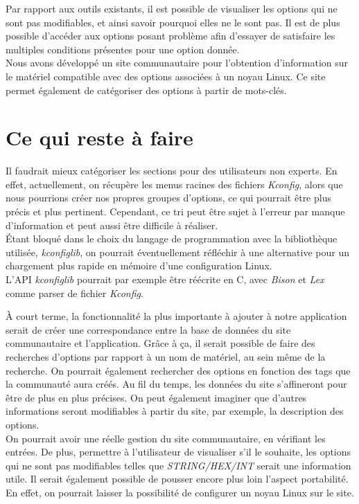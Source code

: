 ﻿\documentclass[17pts]{report}
\begin{document}
Par rapport aux outils existants, il est possible de visualiser les options qui
ne sont pas modifiables, et ainsi savoir pourquoi elles ne le sont pas.  Il est
de plus possible d'accéder aux options posant problème afin d'essayer de
satisfaire les multiples conditions présentes pour une option donnée.\\

Nous avons développé un site communautaire pour l'obtention d'information sur
le matériel compatible avec des options associées à un noyau Linux. Ce site
permet également de catégoriser des options à partir de mots-clés.

\section{Ce qui reste à faire}
\label{sec:Ce qui reste à faire}
Il faudrait mieux catégoriser les sections pour des utilisateurs non experts.
En effet, actuellement, on récupère les menus racines des fichiers
\textit{Kconfig}, alors que nous pourrions créer nos propres groupes d'options,
ce qui pourrait être plus précis et plus pertinent. Cependant, ce tri peut être
sujet à l'erreur par manque d'information et peut aussi être difficile à
réaliser.\\

Étant bloqué dans le choix du langage de programmation avec la bibliothèque
utilisée, \textit{kconfiglib}, on pourrait éventuellement réfléchir à une
alternative pour un chargement plus rapide en mémoire d'une configuration
Linux.\\

L'API \textit{kconfiglib} pourrait par exemple être réécrite en C, avec
\textit{Bison} et \textit{Lex} comme parser de fichier \textit{Kconfig}.

À court terme, la fonctionnalité la plus importante à ajouter à notre
application serait de créer une correspondance entre la base de données du site
communautaire et l'application. Grâce à ça, il serait possible de faire des
recherches d'options par rapport à un nom de matériel, au sein même de la
recherche. On pourrait également rechercher des options en fonction des tags
que la communauté aura créés. Au fil du temps, les données du site s'affineront
pour être de plus en plus précises. On peut également imaginer que d'autres
informations seront modifiables à partir du site, par exemple, la
description des options.\\

On pourrait avoir une réelle gestion du site communautaire, en vérifiant les
entrées. De plus, permettre à l'utilisateur de visualiser s'il le souhaite, les
options qui ne sont pas modifiables telles que \textit{STRING/HEX/INT} serait
une information utile. Il serait également possible de pousser encore plus
loin l'aspect portabilité. En effet, on pourrait laisser la possibilité de
configurer un noyau Linux sur le site.\\
\end{document}
